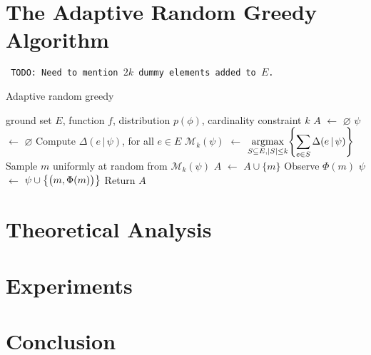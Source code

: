 \documentclass{article}
\newcommand{\todo}[1]{\noindent\texttt{\small\color[rgb]{0.5,0.1,0.1} TODO: #1}}
\newcommand*\LET[2]{\STATE #1 $\gets$ #2}
\newcommand{\argmax}{\operatornamewithlimits{argmax}}
\let\originalleft\left
\let\originalright\right
\renewcommand{\left}{\mathopen{}\mathclose\bgroup\originalleft}
\renewcommand{\right}{\aftergroup\egroup\originalright}
\newcommand{\mmid}{\,\vert\,}
\newcommand{\D}[2]{\Delta(#1\mmid#2)}
\begin{document}
\section{The Adaptive Random Greedy Algorithm}
\todo{Need to mention $2k$ dummy elements added to $E$.}

\begin{algorithm}[!b]
  \caption{Adaptive random greedy}
  \label{alg:rg}
\normalsize{
\begin{algorithmic}[1]
  \REQUIRE ground set $E$, function $f$, distribution $p(\phi)$, cardinality constraint $k$
  \LET{$A$}{$\varnothing$}
  \LET{$\psi$}{$\varnothing$}
    \STATE Compute $\D{e}{\psi}$, for all $e \in E$ \label{lin:marg}
    \LET{$\mathcal{M}_k(\psi)$}{$\displaystyle\argmax_{S \subseteq E, |S| \leq k}\left\{\sum_{e \in S} \D{e}{\psi} \right\}$} \label{lin:argmax}
    \STATE Sample $m$ uniformly at random from $\mathcal{M}_k(\psi)$
    \LET{$A$}{$A \cup \{m\}$}
    \STATE Observe $\Phi(m)$
    \LET{$\psi$}{$\psi \cup \left\{\big(m, \Phi(m)\big)\right\}$}
  \ENDFOR
  \STATE Return $A$
\end{algorithmic}
}
\end{algorithm}

\section{Theoretical Analysis}

\section{Experiments}

\section{Conclusion}




\iftoggle{short}
{}
{
\clearpage
\onecolumn
\appendix

}
\end{document}

